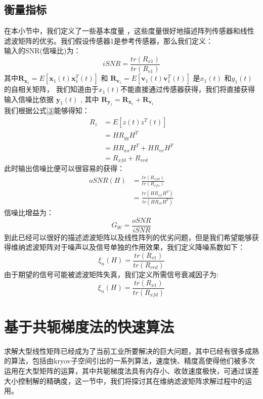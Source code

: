 \subsection{衡量指标}
在本小节中，我们定义了一些基本度量 \cite{ref13}，这些度量很好地描述阵列传感器和线性滤波矩阵的优劣。我们假设传感器1是参考传感器，那么我们定义：\\
输入的SNR(信噪比)为：
\begin{equation}
iSNR=\frac{tr(R_{x1})}{tr(R_{v1})} 
\end{equation}
其中$\mathbf{R}_{\mathbf{x}_{1}}=E\left[\mathbf{x}_{1}(t) \mathbf{x}_{1}^{T}(t)\right]$  和  $\mathbf{R}_{\mathbf{v}_{1}}=E\left[\mathbf{v}_{1}(t) \mathbf{v}_{1}^{T}(t)\right] $ 是$x_1(t)$ 和$y_1(t)$ 的自相关矩阵， 我们知道由于$x_1(t)$不能直接通过传感器获得，我们将直接获得输入信噪比依据 $\mathbf{y}_{1}(t)$ , 其中  $\mathbf{R}_{\mathbf{y}_{1}}=   \mathbf{R}_{\mathbf{x}_{1}}+\mathbf{R}_{\mathbf{v}_{1}} $ \\
我们根据公式\ref{3}能够得知：
\begin{equation}
\begin{align}
R_z&=E[z(t)z^T(t)] \\
&=HR_{yy}H^T \\
&=HR_{xx}H^T+HR_{vv}H^T \\
&=R_{xfd}+R_{vrd}
\end{align}
\end{equation}
此时输出信噪比便可以很容易的获得：
\begin{equation}
	\begin{align}
		oSNR(H)&=\frac{tr(R_{xfd})}{tr(R_{vfn})} \\
		&=\frac{tr(HR_{xx}H^T)}{tr(HR_{vv}H^T)}
	\end{align}
\end{equation}
信噪比增益为：
\begin{equation}
		G_W=\frac{oSNR}{iSNR} 
\end{equation}
到此已经可以很好的描述滤波矩阵以及线性阵列的优劣问题，但是我们希望能够获得维纳滤波矩阵对于噪声以及信号单独的作用效果，我们定义降噪系数如下：
\begin{equation}
\xi _n(H)=\frac{tr(R_{v1})}{tr(R_{vrd})}  
\end{equation}
由于期望的信号可能被滤波矩阵失真，我们定义所需信号衰减因子为:
\begin{equation}
	\xi _n(H)=\frac{tr(R_{x1})}{tr(R_{xfd})}  
\end{equation}

\section{基于共轭梯度法的快速算法}
求解大型线性矩阵已经成为了当前工业所要解决的巨大问题，其中已经有很多成熟的算法，包括由kryov子空间引出的一系列算法，速度快、精度高使得他们被多次运用在大型矩阵的运算，其中共轭梯度法\cite{ref8}具有内存小、收敛速度极快，可通过误差大小控制解的精确度，这一节中，我们将探讨其在维纳滤波矩阵求解过程中的运用。
